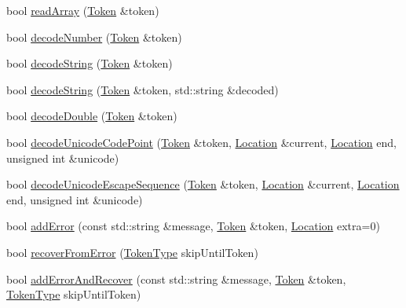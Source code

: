 \begin{DoxyCompactItemize}
\item 
bool \hyperlink{classJson_1_1Reader_afd9a30c0af205c9f327613f486fae6b8}{read\-Array} (\hyperlink{classJson_1_1Reader_1_1Token}{Token} \&token)
\item 
bool \hyperlink{classJson_1_1Reader_a442d1f23edf0f4350f5eeab3ee3f7d46}{decode\-Number} (\hyperlink{classJson_1_1Reader_1_1Token}{Token} \&token)
\item 
bool \hyperlink{classJson_1_1Reader_aaf736937912f5c9b8d221e57f209e3e0}{decode\-String} (\hyperlink{classJson_1_1Reader_1_1Token}{Token} \&token)
\item 
bool \hyperlink{classJson_1_1Reader_a801253570f16e91519652078fb12b8e6}{decode\-String} (\hyperlink{classJson_1_1Reader_1_1Token}{Token} \&token, std\-::string \&decoded)
\item 
bool \hyperlink{classJson_1_1Reader_a2420bbb7fd6d5d3e7e2fea894dd8f70f}{decode\-Double} (\hyperlink{classJson_1_1Reader_1_1Token}{Token} \&token)
\item 
bool \hyperlink{classJson_1_1Reader_a8fe24db3e9953aef3d637a56447e795c}{decode\-Unicode\-Code\-Point} (\hyperlink{classJson_1_1Reader_1_1Token}{Token} \&token, \hyperlink{classJson_1_1Reader_a46795b5b272bf79a7730e406cb96375a}{Location} \&current, \hyperlink{classJson_1_1Reader_a46795b5b272bf79a7730e406cb96375a}{Location} end, unsigned int \&unicode)
\item 
bool \hyperlink{classJson_1_1Reader_a469cb6f55971d7c41fca2752a3aa5bf7}{decode\-Unicode\-Escape\-Sequence} (\hyperlink{classJson_1_1Reader_1_1Token}{Token} \&token, \hyperlink{classJson_1_1Reader_a46795b5b272bf79a7730e406cb96375a}{Location} \&current, \hyperlink{classJson_1_1Reader_a46795b5b272bf79a7730e406cb96375a}{Location} end, unsigned int \&unicode)
\item 
bool \hyperlink{classJson_1_1Reader_a04a3a13dbc609dfdf9e3c6723e37ff21}{add\-Error} (const std\-::string \&message, \hyperlink{classJson_1_1Reader_1_1Token}{Token} \&token, \hyperlink{classJson_1_1Reader_a46795b5b272bf79a7730e406cb96375a}{Location} extra=0)
\item 
bool \hyperlink{classJson_1_1Reader_a8d4ed03a43082c5ace81ba5b81425eaf}{recover\-From\-Error} (\hyperlink{classJson_1_1Reader_aa35e6ab574dc399a0a645ad98ed66bc9}{Token\-Type} skip\-Until\-Token)
\item 
bool \hyperlink{classJson_1_1Reader_af47fb7564db6ac21faebaba8cebb41ce}{add\-Error\-And\-Recover} (const std\-::string \&message, \hyperlink{classJson_1_1Reader_1_1Token}{Token} \&token, \hyperlink{classJson_1_1Reader_aa35e6ab574dc399a0a645ad98ed66bc9}{Token\-Type} skip\-Until\-Token)

\end{DoxyCompactItemize}
